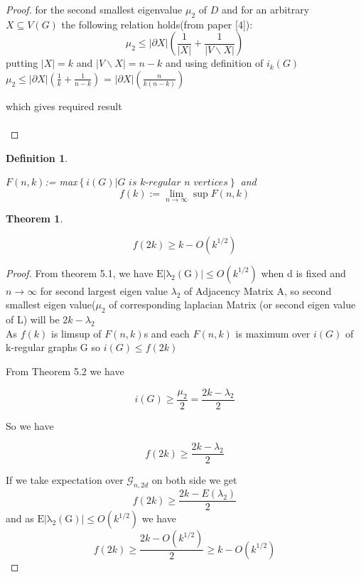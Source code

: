 \documentclass[oneside]{book}
\newtheorem{theorem}{Theorem}[section]
\newtheorem{mydef}{Definition}[section]
\begin{document}
	\begin{proof}
		for the second smallest eigenvalue $\mu_{2}$ of $D$ and for an arbitrary $X \subseteq V(G)$ the following relation holds(from paper [4]):
		$$
		\mu_{2} \leq|\partial X|\left(\frac{1}{|X|}+\frac{1}{|V \backslash X|}\right)
		$$
		putting $|X| = k $ and $|V\backslash X| = n-k $ and using definition of $i_k(G)$ 
		$ \mu_{2} \leq|\partial X|\left(\frac{1}{k}+\frac{1}{n-k}\right)$ = $|\partial X|\left(\frac{n}{k(n-k)}\right) $ \par
		which gives required result\\\\
	\end{proof} 
	
	\begin{mydef} \label{d:19}
		
		
		$F(n, k)$:= max$\left\{i(G)| \textit{G is k-regular  n vertices} \right\}$ 
		and
		$$
		f(k):=\lim _{n \rightarrow \infty} \sup F(n, k)
		$$
	\end{mydef}
	
	
	\begin{theorem}
		\label{t:15}
		
		
		$$f(2 k) \geq k-O\left(k^{1 / 2}\right)$$ 
		
	\end{theorem}
	
	
	\begin{proof} 
		From theorem 5.1, we have  $\mathrm{E|\lambda_{2}(G)|}
		\leq O(k^{1/2})$ when d is fixed and $n\rightarrow \infty$ for second largest eigen value $\lambda_{2}$ of Adjacency Matrix A, so second smallest eigen value($\mu_{2}$ of corresponding laplacian Matrix (or second eigen value of L) will be $2k - \lambda_{2}$ \\
		
		
		As $f(k)$ is limsup of $F(n,k)$s and each $F(n,k)$ is maximum over $i(G)$ of k-regular graphs G
		so $i(G)\leq f(2k)$
		
		From Theorem 5.2 we have
		
		$$i(G) \geq \frac{\mu_2}{2} = \frac{2k - \lambda_{2}}{2}  $$
		
		So we have
		
		$$
		f(2k) \geq \frac{2k - \lambda_{2}}{2}
		$$
		
		If we take expectation over $\mathscr{G}_{n, 2 d}$ on both side we get 
		$$
		f(2k) \geq \frac{2k - E(\lambda_{2})}{2}
		$$
		and as $\mathrm{E|\lambda_{2}(G)|}
		\leq O(k^{1/2})$ we have 
		$$
		f(2k) \geq \frac{2k - O(k^{1/2})}{2} \geq k - O(k^{1/2}) 
		$$
		
	\end{proof}  
	
\end{document}
